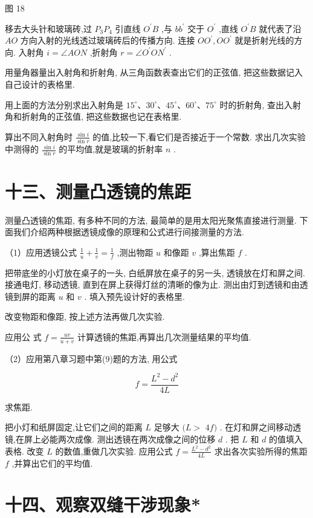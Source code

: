 \documentclass[10pt]{article}
\begin{document}
图 18

移去大头针和玻璃砖,过 \({P}_{3}{P}_{4}\) 引直线 \({O}^{\prime }B\) ,与 \(b{b}^{\prime }\) 交于 \({O}^{\prime }\) ,直线 \({O}^{\prime }B\) 就代表了沿 \({AO}\) 方向入射的光线透过玻璃砖后的传播方向. 连接 \(O{O}^{\prime },O{O}^{\prime }\) 就是折射光线的方向. 入射角 \(i = \angle {AON}\) ,折射角 \(r = \angle {O}^{\prime }O{N}^{\prime }\) .

用量角器量出入射角和折射角, 从三角函数表查出它们的正弦值, 把这些数据记入自己设计的表格里.

用上面的方法分别求出入射角是 \({15}^{ \circ }\text{、}{30}^{ \circ }\text{、}{45}^{ \circ }\text{、}{60}^{ \circ }\text{、}{75}^{ \circ }\) 时的折射角, 查出入射角和折射角的正弦值, 把这些数据也记在表格里.

算出不同入射角时 \(\frac{\sin i}{\sin r}\) 的值,比较一下,看它们是否接近于一个常数. 求出几次实验中测得的 \(\frac{\sin i}{\sin r}\) 的平均值,就是玻璃的折射率 \(n\) .

\section*{十三、测量凸透镜的焦距}

测量凸透镜的焦距, 有多种不同的方法, 最简单的是用太阳光聚焦直接进行测量. 下面我们介绍两种根据透镜成像的原理和公式进行间接测量的方法.

（1）应用透镜公式 \(\frac{1}{u} + \frac{1}{v} = \frac{1}{f}\) ,测出物距 \(u\) 和像距 \(v\) ,算出焦距 \(f\) .

把带底坐的小灯放在桌子的一头, 白纸屏放在桌子的另一头, 透镜放在灯和屏之间. 接通电灯, 移动透镜, 直到在屏上获得灯丝的清晰的像为止. 测出由灯到透镜和由透镜到屏的距离 \(u\) 和 \(v\) . 填入预先设计好的表格里.

改变物距和像距, 按上述方法再做几次实验.

应用公 式 \(f = \frac{uv}{u + v}\) 计算透镜的焦距,再算出几次测量结果的平均值.

（2）应用第八章习题中第(9)题的方法, 用公式

\[
f = \frac{{L}^{2} - {d}^{2}}{4L}
\]

求焦距.

把小灯和纸屏固定,让它们之间的距离 \(L\) 足够大 \((L >\) \({4f})\) . 在灯和屏之间移动透镜,在屏上必能两次成像. 测出透镜在两次成像之间的位移 \(d\) . 把 \(L\) 和 \(d\) 的值填入表格. 改变 \(L\) 的数值,重做几次实验. 应用公式 \(f = \frac{{L}^{2} - {d}^{2}}{4L}\) 求出各次实验所得的焦距 \(f\) ,并算出它们的平均值.

\section*{十四、观察双缝干涉现象*}
\end{document}

